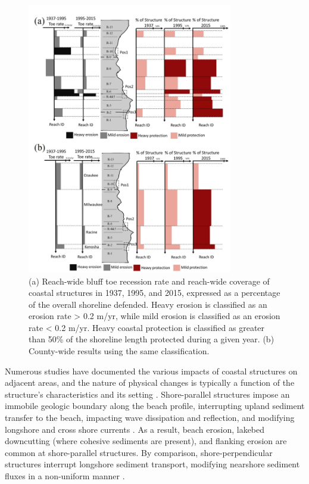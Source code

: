 \begin{figure}[htbp] \centering
\includegraphics[width=0.8\textwidth]{chapter2/resources/figure2-6.jpg}
\caption{(a) Reach-wide bluff toe recession rate and reach-wide coverage of
coastal structures in 1937, 1995, and 2015, expressed as a percentage of the
overall shoreline defended. Heavy erosion is classified as an erosion rate > 0.2
m/yr, while mild erosion is classified as an erosion rate < 0.2 m/yr. Heavy
coastal protection is classified as greater than 50\% of the shoreline length
protected during a given year. (b) County-wide results using the same
classification. } 
\label{fig:fig2.6} 
\end{figure} 

Numerous studies have documented the various impacts of coastal structures on
adjacent areas, and the nature of physical changes is typically a function of
the structure’s characteristics and its setting
\citep[e.g.,][]{kraus1996effects}.  Shore-parallel structures impose an immobile
geologic boundary along the beach profile, interrupting upland sediment transfer
to the beach, impacting wave dissipation and reflection, and modifying longshore
and cross shore currents \citep{lin_field_2014,miles2001field}. As a result,
beach erosion, lakebed downcutting (where cohesive sediments are present), and
flanking erosion are common at shore-parallel structures. By comparison,
shore-perpendicular structures interrupt longshore sediment transport, modifying
nearshore sediment fluxes in a non-uniform manner
\citep{bruun1995development,bruun2001development}. 

